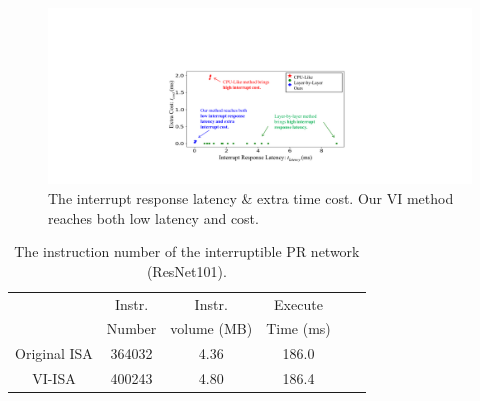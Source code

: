 \begin{figure}[t]
  \centering
  \includegraphics[width=0.99\linewidth]{fig/PRresult.pdf}
  \vspace{-9mm}
  \caption{The interrupt response latency \& extra time cost. Our VI method reaches both low latency and cost.}
  \label{fig:scatter1024}
\end{figure}
\begin{table}[t]
  \small
  \centering
  \caption{The instruction number of the interruptible PR network (ResNet101). }
\begin{tabular}{|c|c|c|c|c|c|}
  \hline
         & Instr.  & Instr. & Execute \\
        & Number   & volume (MB) & Time (ms) \\
  \hline
  Original ISA   &      364032      & 4.36 & 186.0 \\
  \hline
  VI-ISA   &     400243    & 4.80 & 186.4 \\
  \hline
  \end{tabular}%
  \label{tab:instrnum}%
\end{table}%



